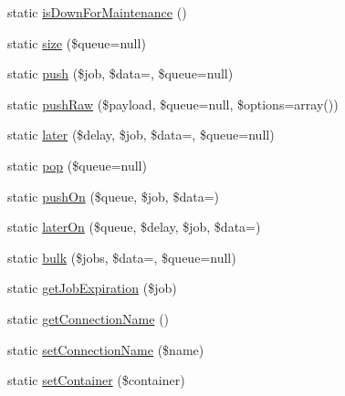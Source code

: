\begin{DoxyCompactItemize}
\item 
static \mbox{\hyperlink{class_illuminate_1_1_support_1_1_facades_1_1_queue_a07ac76a4da451f5a76cfe17ea32bccd0}{is\+Down\+For\+Maintenance}} ()
\item 
static \mbox{\hyperlink{class_illuminate_1_1_support_1_1_facades_1_1_queue_a0a67d96dfa53c28ed1f46e5bc9b99133}{size}} (\$queue=null)
\item 
static \mbox{\hyperlink{class_illuminate_1_1_support_1_1_facades_1_1_queue_a089d965181938d50eb14b2b02b13000d}{push}} (\$job, \$data=\textquotesingle{}\textquotesingle{}, \$queue=null)
\item 
static \mbox{\hyperlink{class_illuminate_1_1_support_1_1_facades_1_1_queue_aad2749d558a9aa33ca546fe14698fc0b}{push\+Raw}} (\$payload, \$queue=null, \$options=array())
\item 
static \mbox{\hyperlink{class_illuminate_1_1_support_1_1_facades_1_1_queue_a0c240253396403c946d0ea7d10f6bb87}{later}} (\$delay, \$job, \$data=\textquotesingle{}\textquotesingle{}, \$queue=null)
\item 
static \mbox{\hyperlink{class_illuminate_1_1_support_1_1_facades_1_1_queue_a141667b7e321120b3ca7ac7968ec3bf5}{pop}} (\$queue=null)
\item 
static \mbox{\hyperlink{class_illuminate_1_1_support_1_1_facades_1_1_queue_a3a93abf7cc4bb41b49d78ef0927967f7}{push\+On}} (\$queue, \$job, \$data=\textquotesingle{}\textquotesingle{})
\item 
static \mbox{\hyperlink{class_illuminate_1_1_support_1_1_facades_1_1_queue_a27a4e841c8af2c85e28b199ecc7da3ef}{later\+On}} (\$queue, \$delay, \$job, \$data=\textquotesingle{}\textquotesingle{})
\item 
static \mbox{\hyperlink{class_illuminate_1_1_support_1_1_facades_1_1_queue_a49cac55a7c41728b0c1a7e42397384c9}{bulk}} (\$jobs, \$data=\textquotesingle{}\textquotesingle{}, \$queue=null)
\item 
static \mbox{\hyperlink{class_illuminate_1_1_support_1_1_facades_1_1_queue_a8f37124b980065ea0afb7914dd7467d5}{get\+Job\+Expiration}} (\$job)
\item 
static \mbox{\hyperlink{class_illuminate_1_1_support_1_1_facades_1_1_queue_a1951ce66a067f286771d81530fbf200a}{get\+Connection\+Name}} ()
\item 
static \mbox{\hyperlink{class_illuminate_1_1_support_1_1_facades_1_1_queue_a9dd6771189e2ad44140e77c702f265dc}{set\+Connection\+Name}} (\$name)
\item 
static \mbox{\hyperlink{class_illuminate_1_1_support_1_1_facades_1_1_queue_a63c45aa8d429ab7713cf1bcf52d4fc77}{set\+Container}} (\$container)
\end{DoxyCompactItemize}


